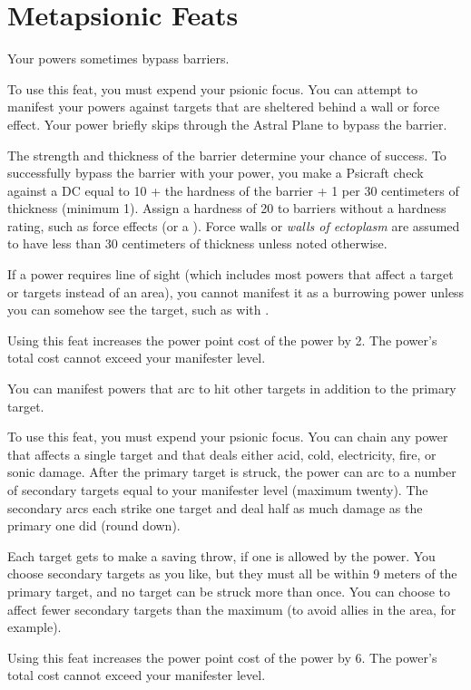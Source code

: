 \section{Metapsionic Feats}

{Your powers sometimes bypass barriers.}{}
{To use this feat, you must expend your psionic focus. You can attempt to manifest your powers against targets that are sheltered behind a wall or force effect. Your power briefly skips through the Astral Plane to bypass the barrier.

The strength and thickness of the barrier determine your chance of success. To successfully bypass the barrier with your power, you make a Psicraft check against a DC equal to 10 + the hardness of the barrier + 1 per 30 centimeters of thickness (minimum 1). Assign a hardness of 20 to barriers without a hardness rating, such as force effects (or a ). Force walls or \emph{walls of ectoplasm} are assumed to have less than 30 centimeters of thickness unless noted otherwise.

If a power requires line of sight (which includes most powers that affect a target or targets instead of an area), you cannot manifest it as a burrowing power unless you can somehow see the target, such as with .

Using this feat increases the power point cost of the power by 2. The power's total cost cannot exceed your manifester level.}{}{}

{You can manifest powers that arc to hit other targets in addition to the primary target.}
{}
{To use this feat, you must expend your psionic focus. You can chain any power that affects a single target and that deals either acid, cold, electricity, fire, or sonic damage. After the primary target is struck, the power can arc to a number of secondary targets equal to your manifester level (maximum twenty). The secondary arcs each strike one target and deal half as much damage as the primary one did (round down).

Each target gets to make a saving throw, if one is allowed by the power. You choose secondary targets as you like, but they must all be within 9 meters of the primary target, and no target can be struck more than once. You can choose to affect fewer secondary targets than the maximum (to avoid allies in the area, for example).

Using this feat increases the power point cost of the power by 6. The power's total cost cannot exceed your manifester level.}{}{}

